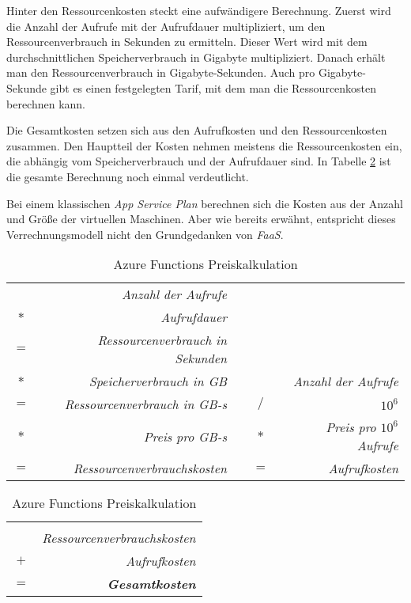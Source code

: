 Hinter den Ressourcenkosten steckt eine aufwändigere Berechnung. Zuerst wird die Anzahl der Aufrufe mit der Aufrufdauer multipliziert, um den Ressourcenverbrauch in Sekunden zu ermitteln. Dieser Wert wird mit dem durchschnittlichen Speicherverbrauch in Gigabyte multipliziert. Danach erhält man den Ressourcenverbrauch in Gigabyte-Sekunden. Auch pro Gigabyte-Sekunde gibt es einen festgelegten Tarif, mit dem man die Ressourcenkosten berechnen kann.

Die Gesamtkosten setzen sich aus den Aufrufkosten und den Ressourcenkosten zusammen. Den Hauptteil der Kosten nehmen meistens die Ressourcenkosten ein, die abhängig vom Speicherverbrauch und der Aufrufdauer sind. In Tabelle \ref{tab:azfun-pricing} ist die gesamte Berechnung noch einmal verdeutlicht.

Bei einem klassischen \textit{App Service Plan} berechnen sich die Kosten aus der Anzahl und Größe der virtuellen Maschinen. Aber wie bereits erwähnt, entspricht dieses Verrechnungsmodell nicht den Grundgedanken von \textit{FaaS}.

\begin{table}[!hbt]
\caption{Azure Functions Preiskalkulation}
\label{tab:azfun-pricing}
\centering

\begin{tabular}{crccr}
& \textit{Anzahl der Aufrufe} & & & \\
$*$ & \textit{Aufrufdauer} & & & \\
\cline{1-2}
$=$ & \textit{Ressourcenverbrauch in Sekunden} & & & \\
$*$ & \textit{Speicherverbrauch in GB} & & & \textit{Anzahl der Aufrufe} \\
\cline{1-2}
$=$ & \textit{Ressourcenverbrauch in GB-s} & & $/$ & $10^6$ \\
$*$ & \textit{Preis pro GB-s} & & $*$ & \textit{Preis pro $10^6$ Aufrufe} \\
\cline{1-2}\cline{4-5}
$=$ & \textit{Ressourcenverbrauchskosten} & & $=$ & \textit{Aufrufkosten} \\
\end{tabular}

\begin{tabular}{cr}
 & \\
& \textit{Ressourcenverbrauchskosten} \\
$+$ & \textit{Aufrufkosten} \\
\hline
$=$ & \textit{\textbf{Gesamtkosten}} \\
\hline\hline
\end{tabular}

\end{table}

